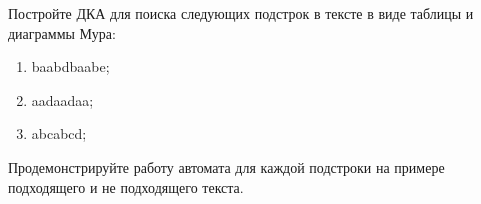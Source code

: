 \question 
Постройте ДКА для поиска следующих подстрок в тексте в виде таблицы и диаграммы Мура:
\begin{enumerate}
\item  baabdbaabe;
\item  aadaadaa;
\item  abcabcd;
\end{enumerate}
Продемонстрируйте работу автомата для каждой подстроки на примере подходящего и не подходящего текста.